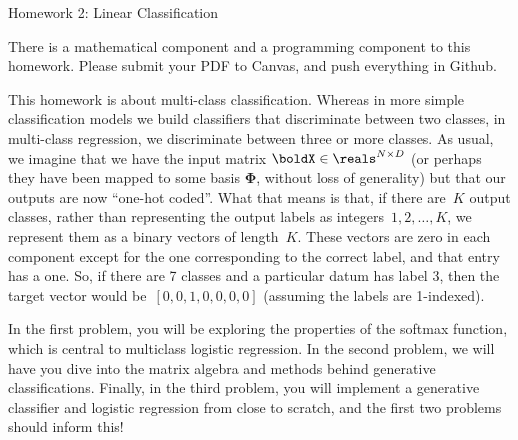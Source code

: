 \documentclass[submit]{harvardml}
\begin{document}
\begin{center}
{\Large Homework 2: Linear Classification}\\
\end{center}

There is a mathematical component and a programming
component to this homework. Please submit your PDF to Canvas, and push everything in Github.

This homework is about multi-class classification. Whereas in more simple
classification models we build classifiers that discriminate between two classes,
in multi-class regression, we discriminate between three or more classes.  As
usual, we imagine that we have the input matrix $\boldX \in \reals^{N \times D}$
(or perhaps they have been mapped to some basis $\bm{\Phi}$, without loss
of generality) but that our outputs are now ``one-hot coded''.  What that means
is that, if there are~$K$ output classes, rather than representing the output
labels as integers~${1,2,\ldots,K}$, we represent them as a binary vectors of
length~$K$.  These vectors are zero in each component except for the one
corresponding to the correct label, and that entry has a one.  So, if there are
7 classes and a particular datum has label 3, then the target vector would
be~${[0,0,1,0,0,0,0]}$ (assuming the labels are 1-indexed).

In the first problem, you will be exploring the properties of the softmax
function, which is central to multiclass logistic regression.  In the second
problem, we will have you dive into the matrix algebra and methods behind
generative classifications.  Finally, in the third problem, you will implement a
generative classifier and logistic regression from close to scratch, and the
first two problems should inform this!
\end{document}
